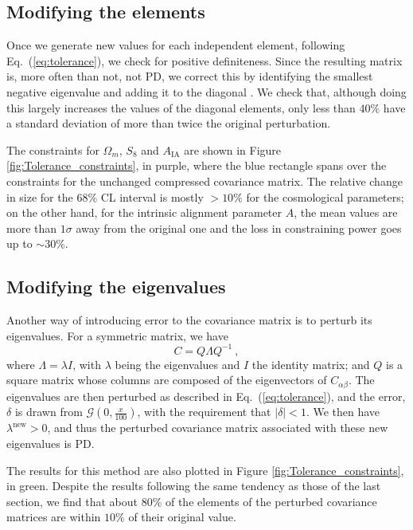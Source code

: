 \documentclass[twocolumn,nofootinbib]{\docclass}
\newcommand{\rf}[1]{Figure \ref{fig:#1}}
\newcommand{\ec}[1]{Eq.~(\ref{eq:#1})}
\newcommand\be{\begin{equation}}
\newcommand\ee{\end{equation}}
\begin{document}
	\subsection{Modifying the elements}
	
	Once we generate new values for each independent element, following \ec{tolerance}, we check for positive definiteness. Since the resulting matrix is, more often than not, not PD, we correct this by identifying the smallest negative eigenvalue and adding it to the diagonal \cite{Yuan:2008}. We check that, although doing this largely increases the values of the diagonal elements, only less than $40 \%$ have a standard deviation of more than twice the original perturbation. 
	
	The constraints for $\Omega_m$, $S_8$ and $A_{\mathrm{IA}}$ are shown in \rf{Tolerance_constraints}, in purple, where the blue rectangle spans over the constraints for the unchanged compressed covariance matrix. The relative change in size for the 68\% CL interval is mostly $> 10 \%$ for the cosmological parameters; on the other hand, for the intrinsic alignment parameter $A$, the mean values are more than $1\sigma$ away from the original one and the loss in constraining power goes up to $\sim 30 \%$.
	
	\subsection{Modifying the eigenvalues}
	
	Another way of introducing error to the covariance matrix is to perturb its eigenvalues. For a symmetric matrix, we have
	\be
	C = Q\Lambda Q^{-1}\ 
	,\ee
	where $\Lambda = \lambda I$, with $\lambda$ being the eigenvalues and $I$ the identity matrix; and $Q$ is a square matrix whose columns are composed of the eigenvectors of $C_{\alpha \beta}$. The eigenvalues are then perturbed as described in \ec{tolerance}, and the error, $\delta$ is drawn from $\mathcal{G}(0,\frac{x}{100})$, with the requirement that $|\delta| < 1$. We then have $\lambda^{\mathrm{new}} > 0$, and thus the perturbed covariance matrix associated with these new eigenvalues is PD. 
	
	The results for this method are also plotted in \rf{Tolerance_constraints}, in green. Despite the results following the same tendency as those of the last section, we find that about $80\%$ of the elements of the perturbed covariance matrices are within $10\%$ of their original value.
	
\end{document}
